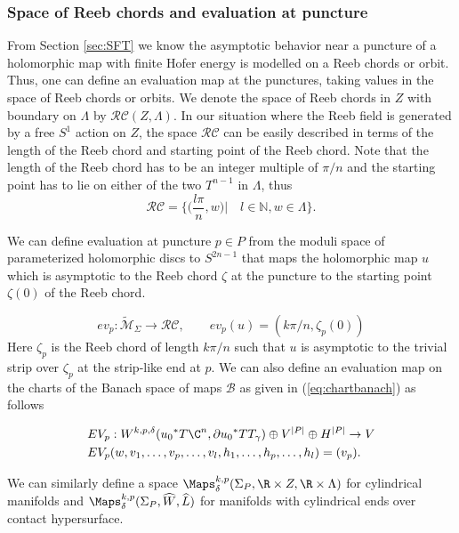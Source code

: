 \subsubsection{Space of Reeb chords and evaluation at puncture}

From Section \ref{sec:SFT} we know the asymptotic behavior near a puncture of a holomorphic map with finite Hofer energy is modelled on a Reeb chords or orbit. Thus, one can define an evaluation map at the punctures, taking values in the space of Reeb chords or orbits. We denote the space of Reeb chords in $Z$ with boundary on $\Lambda$ by $\mathcal{RC }(Z,\Lambda)$. In our situation where the Reeb field is generated by a free $S^1$ action on $Z$, the space $\mathcal{RC}$ can be easily described in terms of the length of the Reeb chord and starting point of the Reeb chord. Note that the length of the Reeb chord has to be an integer multiple of $\pi/n$ and the starting point has to lie on either of the two $T^{n-1}$ in $\Lambda$, thus $$\mathcal{RC}=\Bigg \{ \bigg(\frac{l\pi}{n},w \bigg) \bigg|\quad l\in \mathbb{N}, w\in \Lambda \Bigg \}.$$

\noindent We can define evaluation at puncture $p \in P$ from the moduli space of parameterized holomorphic discs to $S^{2n-1}$ that maps the holomorphic map $u$ which is asymptotic to the Reeb chord $\zeta$ at the puncture to the starting point $\zeta(0)$ of the Reeb chord.

\begin{equation*}
    ev_p : \widetilde{\mathcal{M}}_\Sigma \to \mathcal{RC},\qquad ev_p(u) = (k\pi/n,\zeta_p(0))
\end{equation*}
Here $\zeta_p$ is the Reeb chord of length $k\pi/n$ such that $u$ is asymptotic to the trivial strip over $\zeta_p$ at the strip-like end at $p$. We can also define an evaluation map on the charts of the Banach space of maps $\mathcal{B}$ as given in (\ref{eq:chartbanach}) as follows

\begin{align*}
    &EV_p : W^{k,p,\delta}({u_0}^* T\C^n,\partial {u_0}^* TT_\gamma) \oplus V^{|P|} \oplus H^{|P|} \to V\\
    &EV_p(w,v_1,\dots,v_p,\dots,v_l,h_1,\dots,h_p,\dots,h_l)=(v_p).
    \end{align*}

\begin{remark}
We can similarly define a space $\Maps^{k,p}_{\delta}(\Sigma_P, \R \times Z , \R \times \Lambda) $ for cylindrical manifolds and $\Maps^{k,p}_{\delta}(\Sigma_P, \widehat W , \widehat L)$ for manifolds with cylindrical ends over contact hypersurface. 
\end{remark}


